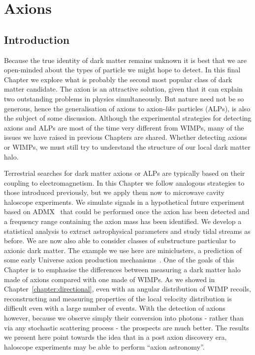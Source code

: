 \chapter{Axions}\label{chapter:axions}

\section{Introduction}\label{sec:axions_intro}
Because the true identity of dark matter remains unknown it is best that we are open-minded about the types of particle we might hope to detect. In this final Chapter we explore what is probably the second most popular class of dark matter candidate. The axion is an attractive solution, given that it can explain two outstanding problems in physics simultaneously. But nature need not be so generous, hence the generalisation of axions to axion-{\it like} particles (ALPs), is also the subject of some discussion. Although the experimental strategies for detecting axions and ALPs are most of the time very different from WIMPs, many of the issues we have raised in previous Chapters are shared. Whether detecting axions or WIMPs, we must still try to understand the structure of our local dark matter halo.

Terrestrial searches for dark matter axions or ALPs are typically based on their coupling to electromagnetism. In this Chapter we follow analogous strategies to those introduced previously, but we apply them now to microwave cavity haloscope experiments. We simulate signals in a hypothetical future experiment based on ADMX~\cite{Asztalos:2009yp} that could be performed once the axion has been detected and a frequency range containing the axion mass has been identified. We develop a statistical analysis to extract astrophysical parameters and study tidal streams as before. We are now also able to consider classes of substructure particular to axionic dark matter. The example we use here are miniclusters, a prediction of some early Universe axion production mechanisms~\cite{Hogan:1988mp}. One of the goals of this Chapter is to emphasise the differences between measuring a dark matter halo made of axions compared with one made of WIMPs. As we showed in Chapter~\ref{chapter:directional}, even with an angular distribution of WIMP recoils, reconstructing and measuring properties of the local velocity distribution is difficult even with a large number of events. With the detection of axions however, because we observe simply their conversion into photons - rather than via any stochastic scattering process - the prospects are much better. The results we present here point towards the idea that in a post axion discovery era, haloscope experiments may be able to perform ``axion astronomy''.

